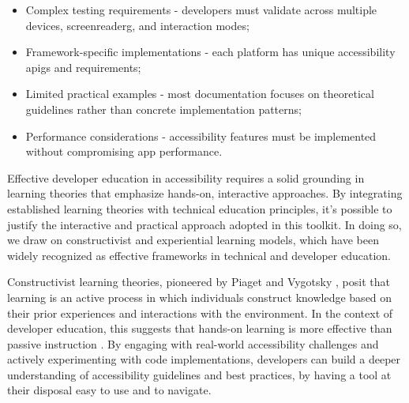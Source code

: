 \begin{itemize}
    \item Complex testing requirements - developers must validate across multiple devices, \gls{screenreaderg}, and interaction modes;
    
    \item Framework-specific implementations - each platform has unique accessibility \gls{apig}s and requirements;
    
    \item Limited practical examples - most documentation focuses on theoretical guidelines rather than concrete implementation patterns;
    
    \item Performance considerations - accessibility features must be implemented without compromising app performance.
\end{itemize}

Effective developer education in accessibility requires a solid grounding in learning theories that emphasize hands-on, interactive approaches. By integrating established learning theories with technical education principles, it's possible to justify the interactive and practical approach adopted in this toolkit. In doing so, we draw on constructivist and experiential learning models, which have been widely recognized as effective frameworks in technical and developer education.

Constructivist learning theories, pioneered by Piaget \cite{piaget1970science} and Vygotsky \cite{vygotsky1978mind}, posit that learning is an active process in which individuals construct knowledge based on their prior experiences and interactions with the environment. In the context of developer education, this suggests that hands-on learning is more effective than passive instruction \cite{savery2006overview}. By engaging with real-world accessibility challenges and actively experimenting with code implementations, developers can build a deeper understanding of accessibility guidelines and best practices, by having a tool at their disposal easy to use and to navigate. \\

